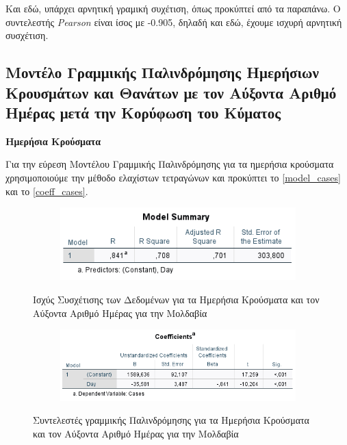 \documentclass{article}
\begin{document}
    Και εδώ, υπάρχει αρνητική γραμική συχέτιση, όπως προκύπτεί από τα παραπάνω. Ο συντελεστής \emph{\foreignlanguage{english}{Pearson}} είναι ίσος με -0.905, δηλαδή και εδώ, έχουμε ισχυρή αρνητική συσχέτιση.
    
    
    \subsection{Μοντέλο Γραμμικής Παλινδρόμησης Ημερήσιων Κρουσμάτων και Θανάτων με τον Αύξοντα Αριθμό Ημέρας μετά την Κορύφωση του Κύματος}
    
    
    {\large \textbf{Ημερήσια Κρούσματα}}
    
    Για την εύρεση Μοντέλου Γραμμικής Παλινδρόμησης για τα ημερήσια κρούσματα χρησιμοποιούμε την μέθοδο ελαχίστων τετραγώνων και προκύπτει το \autoref{model_cases} και το  \autoref{coeff_cases}.
    
    \begin{figure}[H]
    \centering
    \begin{adjustbox}{center}
    	\begin{subfigure}[c]{1\textwidth}    
    		\includegraphics[width=1\textwidth,height=\textheight,keepaspectratio]{media/2/model_sum_cases.png}
    	\end{subfigure}%
    \end{adjustbox}
    \caption{Ισχύς Συσχέτισης των Δεδομένων για τα Ημερήσια Κρούσματα και τον Αύξοντα Αριθμό Ημέρας για την Μολδαβία}
    \label{model_cases}
    \end{figure}
    
    \begin{figure}[H]
    \centering
    \begin{adjustbox}{center}
    	\begin{subfigure}[c]{1\textwidth}    
    		\includegraphics[width=1\textwidth,height=\textheight,keepaspectratio]{media/2/coeff_cases.png}
    	\end{subfigure}%
    \end{adjustbox}
    \caption{Συντελεστές γραμμικής Παλινδρόμησης για τα Ημερήσια Κρούσματα και τον Αύξοντα Αριθμό Ημέρας για την Μολδαβία}
    \label{coeff_cases}
    \end{figure}
    
\end{document}
